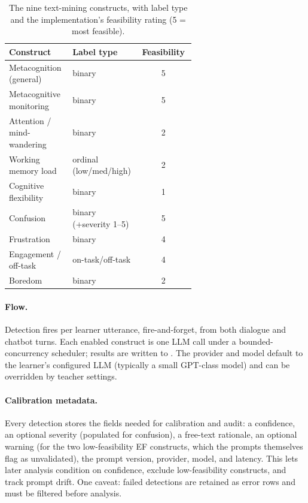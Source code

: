 \begin{table}[htbp]
\centering
\small
\caption{The nine text-mining constructs, with label type and the
implementation's feasibility rating (5 = most feasible).}
\label{tab:ef-constructs}
\begin{tabular}{@{}p{0.34\linewidth}p{0.28\linewidth}c@{}}
\toprule
Construct & Label type & Feasibility \\
\midrule
Metacognition (general) & binary & 5 \\
Metacognitive monitoring & binary & 5 \\
Attention / mind-wandering & binary & 2 \\
Working memory load & ordinal (low/med/high) & 2 \\
Cognitive flexibility & binary & 1 \\
Confusion & binary (+severity 1--5) & 5 \\
Frustration & binary & 4 \\
Engagement / off-task & on-task/off-task & 4 \\
Boredom & binary & 2 \\
\bottomrule
\end{tabular}
\end{table}

\paragraph{Flow.} Detection fires per learner utterance, fire-and-forget,
from both dialogue and chatbot turns. Each enabled construct is one LLM
call under a bounded-concurrency scheduler; results are written to
. The provider and model default to the learner's
configured LLM (typically a small GPT-class model) and can be overridden
by teacher settings.

\paragraph{Calibration metadata.} Every detection stores the fields needed
for calibration and audit: a confidence, an optional severity (populated
for confusion), a free-text rationale, an optional warning (for the two
low-feasibility EF constructs, which the prompts themselves flag as
unvalidated), the prompt version, provider, model, and latency. This lets
later analysis condition on confidence, exclude low-feasibility constructs,
and track prompt drift. One caveat: failed detections are retained as
error rows and must be filtered before analysis.

